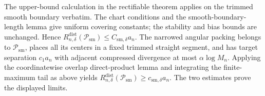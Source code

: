 The upper-bound calculation in the rectifiable theorem applies on the trimmed smooth boundary verbatim.  The chart conditions and the smooth-boundary-length lemma give uniform covering constants; the stability and bias bounds are unchanged.  Hence \(R_{n,\delta}^{\mathrm{dist}}(\mathcal P_{\mathrm{sm}})\leq C_{\mathrm{sm},\delta}a_n\).  The narrowed angular packing belongs to \(\mathcal P_{\mathrm{sm}}\), places all its centers in a fixed trimmed straight segment, and has target separation \(c_1a_n\) with adjacent compressed divergence at most \(\alpha\log M_n\).  Applying the coordinatewise overlap direct-product lemma and integrating the finite-maximum tail as above yields \(R_{n,\delta}^{\mathrm{dist}}(\mathcal P_{\mathrm{sm}})\geq c_{\mathrm{sm},\delta}a_n\).  The two estimates prove the displayed limits.